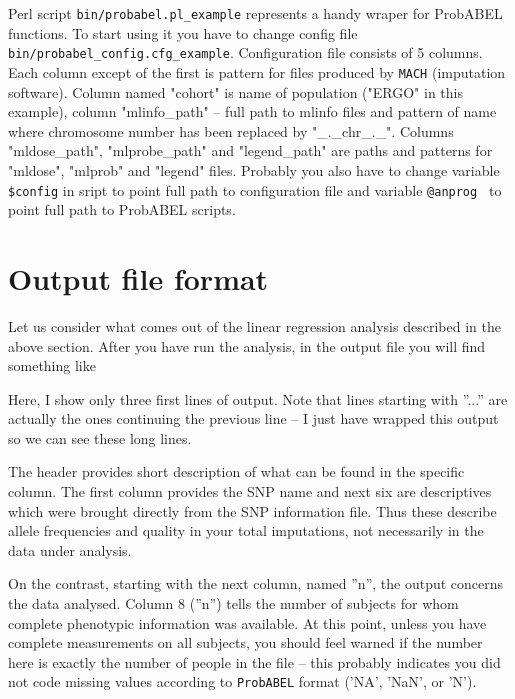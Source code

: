 \documentclass[12pt]{article}
\begin{document}
Perl script \texttt{bin/probabel.pl\_example} represents a handy wraper for ProbABEL functions. 
To start using it you have to change config file \\
\texttt{bin/probabel\_config.cfg\_example}.
Configuration file consists of 5 columns. Each column except of the first is pattern for 
files produced by \texttt{MACH} (imputation software). 
Column named "cohort" is name of population ("ERGO" in this example), column "mlinfo\_path" -- 
full path to mlinfo files and pattern of name where chromosome number has been 
replaced by "\_.\_chr\_.\_". Columns "mldose\_path", "mlprobe\_path" and "legend\_path" 
are paths and patterns for "mldose", "mlprob" and "legend" files.
Probably you also have to change variable \texttt{\$config} in sript to point full path to 
configuration file and variable \texttt{@anprog } to point full path to ProbABEL scripts.


\section{Output file format}

Let us consider what comes out of the linear regression analysis 
described in the above section. After you have run the analysis, in 
the output file you will find something like

\begin{small}

\end{small}

Here, I show only three first lines of output. Note that lines 
starting with ''...'' are actually the ones continuing the 
previous line -- I just have wrapped this output so we can see 
these long lines. 

The header provides short description of what can be found in the 
specific column. The first column provides the SNP name and 
next six are descriptives which were brought directly from the 
SNP information file. Thus these describe allele frequencies and 
quality in your total imputations, not necessarily in the data under 
analysis. 

On the contrast, starting with the next column, named ''n'', 
the output concerns the data analysed. Column 8 (''n'') tells the 
number of subjects for whom complete phenotypic information was available. 
At this point, unless you have complete measurements on all 
subjects, you should feel warned if the number here is exactly the 
number of people in the file -- this probably indicates you did not code 
missing values according to \texttt{ProbABEL} format ('NA', 'NaN', or 'N').
\end{document}
